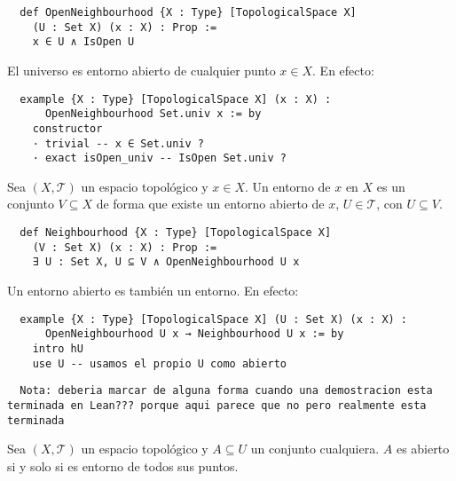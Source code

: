 \begin{lstlisting}
  def OpenNeighbourhood {X : Type} [TopologicalSpace X]
    (U : Set X) (x : X) : Prop :=
    x ∈ U ∧ IsOpen U
\end{lstlisting}

\begin{example}
  El universo es entorno abierto de cualquier punto $x \in X$. En efecto:
\end{example}

\begin{lstlisting}
  example {X : Type} [TopologicalSpace X] (x : X) :
      OpenNeighbourhood Set.univ x := by
    constructor
    · trivial -- x ∈ Set.univ ?
    · exact isOpen_univ -- IsOpen Set.univ ? \end{lstlisting}

\begin{definition}
  Sea $(X, \mathcal{T})$ un espacio topológico y $x \in X$. Un \textnormal{entorno} de $x$ en $X$ es un conjunto $V \subseteq X$ de forma que existe un entorno abierto de $x$, $U \in \mathcal{T}$, con $U \subseteq V$.
\end{definition}

\begin{lstlisting}
  def Neighbourhood {X : Type} [TopologicalSpace X]
    (V : Set X) (x : X) : Prop :=
    ∃ U : Set X, U ⊆ V ∧ OpenNeighbourhood U x
\end{lstlisting}

\begin{example}
  Un entorno abierto es también un entorno. En efecto:
\end{example}

\begin{lstlisting}
  example {X : Type} [TopologicalSpace X] (U : Set X) (x : X) :
      OpenNeighbourhood U x → Neighbourhood U x := by
    intro hU
    use U -- usamos el propio U como abierto
\end{lstlisting}

\begin{lstlisting}
  Nota: deberia marcar de alguna forma cuando una demostracion esta terminada en Lean??? porque aqui parece que no pero realmente esta terminada
\end{lstlisting}

\begin{proposition}\label{caracterizacion-abierto}
  Sea $(X, \mathcal{T})$ un espacio topológico y $A \subseteq U$ un conjunto cualquiera. $A$ es abierto si y solo si es entorno de todos sus puntos.
\end{proposition}

